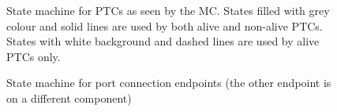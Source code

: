 \documentclass[a4paper,10pt]{article}
\begin{document}
\begin{figure}[!p]
\begin{center}
{}
\end{center}
\caption{\label{figure:state_mach_ptc_mc}State machine for PTCs as seen by the MC. States filled with grey colour and solid lines are used by both alive and non-alive PTCs. States with white background and dashed lines are used by alive PTCs only.}
\end{figure}

\begin{figure}[!p]
\begin{center}
{}
\end{center}
\caption{\label{figure:state_mach_conn_endpoint}State machine for port connection endpoints (the other endpoint is on a different component)}
\end{figure}
\end{document}
